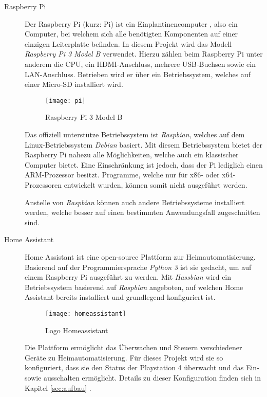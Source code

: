 \begin{description}
    \item[Raspberry Pi \cite{Whatisth47:online}]
        Der Raspberry Pi (kurz: Pi) ist ein Einplantinencomputer \cite{Einplati37:online}, also ein Computer,
        bei welchem sich alle benötigten Komponenten auf einer einzigen Leiterplatte befinden.
        In diesem Projekt wird das Modell \textit{Raspberry Pi 3 Model B} verwendet.
        Hierzu zählen beim Raspberry Pi unter anderem die CPU, ein HDMI-Anschluss, mehrere USB-Buchsen sowie ein LAN-Anschluss.
        Betrieben wird er über ein Betriebssystem, welches auf einer Micro-SD installiert wird.

        \begin{figure}[h!]
            \centering
            \texttt{[image: pi]}
            \caption{Raspberry Pi 3 Model B \cite{Raspberr2:online}}\label{fig:pi}
        \end{figure}

        Das offiziell unterstütze Betriebssystem ist \textit{Raspbian}, welches auf dem Linux-Betriebssystem \textit{Debian} basiert.
        Mit diesem Betriebssystem bietet der Raspberry Pi nahezu alle Möglichkeiten, welche auch ein klassischer Computer bietet.
        Eine Einschränkung ist jedoch, dass der Pi lediglich einen ARM-Prozessor besitzt.
        Programme, welche nur für x86- oder x64-Prozessoren entwickelt wurden, können somit nicht ausgeführt werden.

        Anstelle von \textit{Raspbian} können auch andere Betriebssysteme installiert werden,
        welche besser auf einen bestimmten Anwendungsfall zugeschnitten sind.

    \item[Home Assistant \cite{HomeAssi51:online}]
        Home Assistant ist eine open-source Plattform zur Heimautomatisierung.
        Basierend auf der Programmiersprache \textit{Python 3} ist sie gedacht,
        um auf einem Raspberry Pi ausgeführt zu werden.
        Mit \textit{Hassbian} wird ein Betriebssystem basierend auf \textit{Raspbian} angeboten, auf welchen Home Assistant bereits installiert und grundlegend konfiguriert ist.

        \begin{figure}[h!]
            \centering
            \texttt{[image: homeassistant]}
            \caption{Logo Homeassistant}\label{fig:homeassistant}
        \end{figure}

        Die Plattform ermöglicht das Überwachen und Steuern verschiedener Geräte zu Heimautomatisierung.
        Für dieses Projekt wird sie so konfiguriert,
        dass sie den Status der Playstation 4 überwacht und das Ein- sowie ausschalten ermöglicht.
        Details zu dieser Konfiguration finden sich in Kapitel \ref{sec:aufbau} \textit{}.


\end{description}
